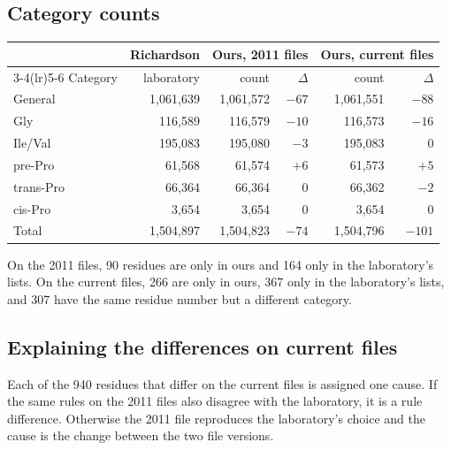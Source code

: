 \documentclass[11pt]{article}
\begin{document}
\subsection{Category counts}

\begin{center}
\begin{tabular}{lrrrrr}
  \toprule
  & Richardson & \multicolumn{2}{c}{Ours, 2011 files} & \multicolumn{2}{c}{Ours, current files} \\
  \cmidrule(lr){3-4}\cmidrule(lr){5-6}
  Category & laboratory & count & $\Delta$ & count & $\Delta$ \\
  \midrule
  General   & 1,061,639 & 1,061,572 & $-67$ & 1,061,551 & $-88$ \\
  Gly       &   116,589 &   116,579 & $-10$ &   116,573 & $-16$ \\
  Ile/Val   &   195,083 &   195,080 &  $-3$ &   195,083 &   $0$ \\
  pre-Pro   &    61,568 &    61,574 &  $+6$ &    61,573 &  $+5$ \\
  trans-Pro &    66,364 &    66,364 &   $0$ &    66,362 &  $-2$ \\
  cis-Pro   &     3,654 &     3,654 &   $0$ &     3,654 &   $0$ \\
  \midrule
  Total     & 1,504,897 & 1,504,823 & $-74$ & 1,504,796 & $-101$ \\
  \bottomrule
\end{tabular}
\end{center}

On the 2011 files, 90 residues are only in ours and 164 only in the laboratory's lists. On the
current files, 266 are only in ours, 367 only in the laboratory's lists, and 307 have the same
residue number but a different category.

\subsection{Explaining the differences on current files}

Each of the 940 residues that differ on the current files is assigned one cause. If the same rules
on the 2011 files also disagree with the laboratory, it is a rule difference. Otherwise the 2011
file reproduces the laboratory's choice and the cause is the change between the two file versions.
\end{document}
